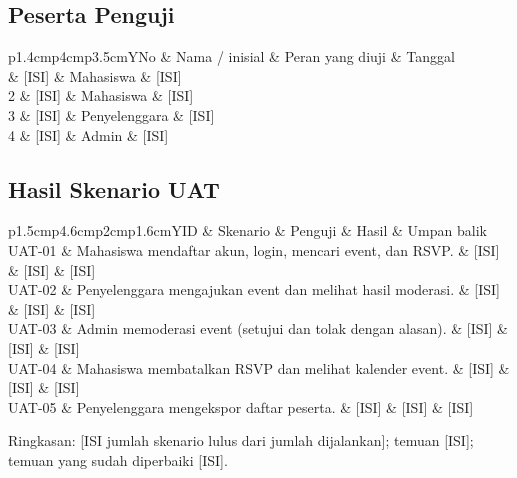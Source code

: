 \documentclass[11pt,a4paper]{article}
\newcommand{\tbl}[2]{\par\smallskip\noindent\begin{tabularx}{\linewidth}{#1}\toprule #2\bottomrule\end{tabularx}\par\smallskip}
\begin{document}
\subsection{Peserta Penguji}
\tbl{p{1.4cm}p{4cm}p{3.5cm}Y}{No & Nama / inisial & Peran yang diuji & Tanggal\\\midrule
1 & [ISI] & Mahasiswa & [ISI]\\
2 & [ISI] & Mahasiswa & [ISI]\\
3 & [ISI] & Penyelenggara & [ISI]\\
4 & [ISI] & Admin & [ISI]\\}
\subsection{Hasil Skenario UAT}
\tbl{p{1.5cm}p{4.6cm}p{2cm}p{1.6cm}Y}{ID & Skenario & Penguji & Hasil & Umpan balik\\\midrule
UAT-01 & Mahasiswa mendaftar akun, login, mencari event, dan RSVP. & [ISI] & [ISI] & [ISI]\\
UAT-02 & Penyelenggara mengajukan event dan melihat hasil moderasi. & [ISI] & [ISI] & [ISI]\\
UAT-03 & Admin memoderasi event (setujui dan tolak dengan alasan). & [ISI] & [ISI] & [ISI]\\
UAT-04 & Mahasiswa membatalkan RSVP dan melihat kalender event. & [ISI] & [ISI] & [ISI]\\
UAT-05 & Penyelenggara mengekspor daftar peserta. & [ISI] & [ISI] & [ISI]\\}
Ringkasan: [ISI jumlah skenario lulus dari jumlah dijalankan]; temuan [ISI]; temuan yang sudah diperbaiki [ISI].
\end{document}
